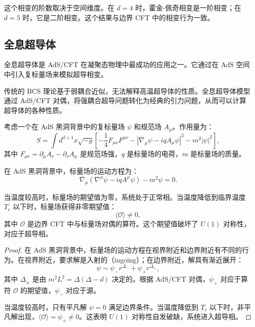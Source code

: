 \begin{remark}
这个相变的阶数取决于空间维度。在 $d=4$ 时，霍金-佩奇相变是一阶相变；在 $d=5$ 时，它是二阶相变。这个结果与边界 CFT 中的相变行为一致。
\end{remark}

\subsection{全息超导体}

全息超导体是 AdS/CFT 在凝聚态物理中最成功的应用之一。它通过在 AdS 空间中引入复标量场来模拟超导相变。

\begin{note}
传统的 BCS 理论基于弱耦合近似，无法解释高温超导体的性质。全息超导体模型通过 AdS/CFT 对偶，将强耦合超导问题转化为经典的引力问题，从而可以计算超导体的各种性质。
\end{note}

\begin{definition}[全息超导体模型]
考虑一个在 AdS 黑洞背景中的复标量场 $\psi$ 和规范场 $A_\mu$。作用量为：
\begin{equation}
    S = \int d^{d+1}x \sqrt{-g} \left[-\frac{1}{4}F_{\mu\nu}F^{\mu\nu} - |\nabla_\mu \psi - i q A_\mu \psi|^2 - m^2 |\psi|^2\right],
\end{equation}
其中 $F_{\mu\nu} = \partial_\mu A_\nu - \partial_\nu A_\mu$ 是规范场强，$q$ 是标量场的电荷，$m$ 是标量场的质量。
\end{definition}

在 AdS 黑洞背景中，标量场的运动方程为：
\begin{equation}
    \nabla_\mu (\nabla^\mu \psi - i q A^\mu \psi) - m^2 \psi = 0.
\end{equation}

\begin{theorem}[全息超导体的相变]
当温度较高时，标量场的期望值为零，系统处于正常相。当温度降低到临界温度 $T_c$ 以下时，标量场获得非零期望值：
\begin{equation}
    \langle \mathcal{O} \rangle \neq 0,
\end{equation}
其中 $\mathcal{O}$ 是边界 CFT 中与标量场对偶的算符。这个期望值破坏了 $U(1)$ 对称性，对应于超导相。
\end{theorem}

\begin{proof}
在 AdS 黑洞背景中，标量场的运动方程在视界附近和边界附近有不同的行为。在视界附近，要求解是入射的（ingoing）；在边界附近，解具有渐近展开：
\begin{equation}
    \psi \sim \psi_- r^{\Delta_-} + \psi_+ r^{\Delta_+},
\end{equation}
其中 $\Delta_\pm$ 是由 $m^2 L^2 = \Delta(\Delta - d)$ 决定的。根据 AdS/CFT 对偶，$\psi_+$ 对应于算符 $\mathcal{O}$ 的期望值，$\psi_-$ 对应于源。

当温度较高时，只有平凡解 $\psi = 0$ 满足边界条件。当温度降低到 $T_c$ 以下时，非平凡解出现，$\langle \mathcal{O} \rangle = \psi_+ \neq 0$。这表明 $U(1)$ 对称性自发破缺，系统进入超导相。
\end{proof}


